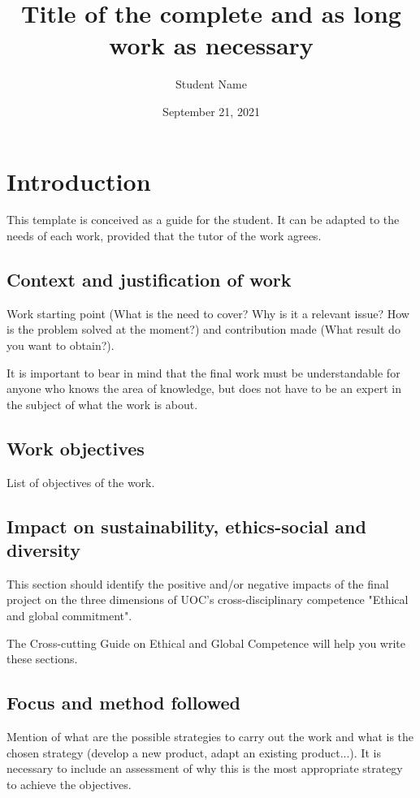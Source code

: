 \documentclass[ENG,BIB]{TFUOC}%
\title{Title of the complete and as long work as necessary}
\author{Student Name}
\date{September 21, 2021}
\begin{document}
\estructura

\tableofcontents

\listoffigures

\listoftables




\chapter{Introduction}

This template is conceived as a guide for the student. It can be adapted to the needs of each work, provided that the tutor of the work agrees.

\section{Context and justification of work}


Work starting point (What is the need to cover? Why is it a relevant issue? How is the problem solved at the moment?) and contribution made (What result do you want to obtain?).

It is important to bear in mind that the final work must be understandable for anyone who knows the area of knowledge, but does not have to be an expert in the subject of what the work is about.

\section{Work objectives}

List of objectives of the work.

\section{Impact on sustainability, ethics-social and diversity}
\label{s:etic}

This section should identify the positive and/or negative impacts of the final project on the three dimensions of UOC's cross-disciplinary competence "Ethical and global commitment".
 
The Cross-cutting Guide on Ethical and Global Competence will help you write these sections.


\section{Focus and method followed}

Mention of what are the possible strategies to carry out the work and what is the chosen strategy (develop a new product, adapt an existing product...). It is necessary to include an assessment of why this is the most appropriate strategy to achieve the objectives.   	
\end{document}
